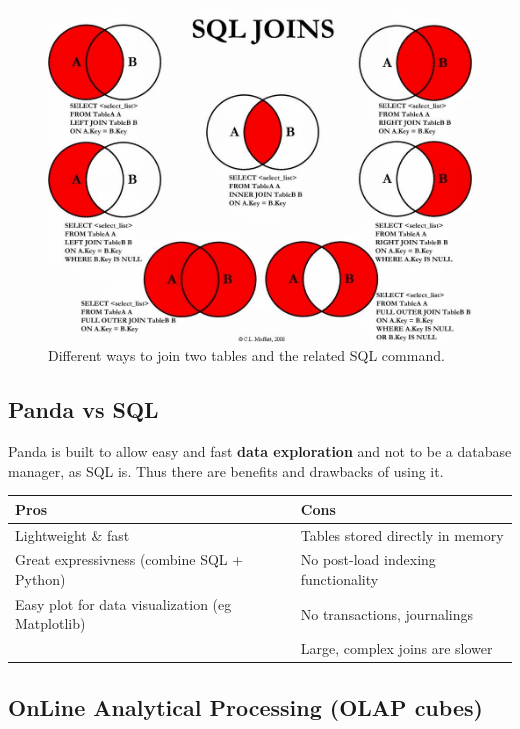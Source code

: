 \documentclass[a4paper,11pt,twoside]{article}
\begin{document}
\begin{figure}%
 \centering
 \includegraphics[width=12cm]{./pic/SQL_joins}
 \caption{\label{join_SQL} Different ways to join two tables and the related SQL command.}
\end{figure}


\subsection{Panda vs SQL}

Panda is built to allow easy and fast \textbf{data exploration} and not to be a database manager, as SQL is. Thus there are benefits and drawbacks of using it.


\begin{center} %
\begin{tabular} {| l | l |}
\hline
\bf Pros & \bf Cons \\ \hline
Lightweight \& fast & Tables stored directly in memory \\
Great expressivness (combine SQL + Python) & No post-load indexing functionality\\
Easy plot for data visualization (eg Matplotlib) & No transactions, journalings\\ 
& Large, complex joins are slower \\ \hline
\end{tabular}
\end{center}

\subsection{OnLine Analytical Processing (OLAP cubes)}
\end{document}
